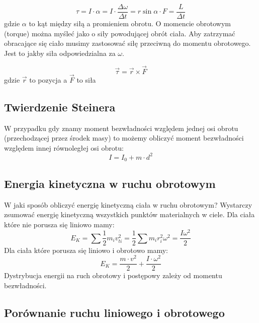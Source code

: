 \documentclass{../notatki}
\begin{document}
$$
\tau = I \cdot \alpha = I \cdot \frac{\Delta \omega}{\Delta t} =
r\sin\alpha \cdot F = \frac{L}{\Delta t}
$$
gdzie $\alpha$ to kąt między siłą a promieniem obrotu.
O momencie obrotowym (torque) można myśleć jako o siły powodującej obrót
ciała. Aby zatrzymać obracające się ciało musimy zastosować siłę przeciwną
do momentu obrotowego. Jest to jakby siła odpowiedzialna za $\omega$.

$$
\vec{\tau} = \vec{r} \times \vec{F}
$$
gdzie $\vec{r}$ to pozycja a $\vec{F}$ to siła

\subsection{Twierdzenie Steinera}

W przypadku gdy znamy moment bezwładności względem jednej osi obrotu
(przechodzącej przez środek masy) to możemy obliczyć moment bezwładności
względem innej równoległej osi obrotu:
$$
I = I_0 + m \cdot d^2
$$

\subsection{Energia kinetyczna w ruchu obrotowym}

W jaki sposób obliczyć energię kinetyczną ciała w ruchu obrotowym? Wystarczy
zsumować energię kinetyczną wszystkich punktów materialnych w ciele.
Dla ciała które nie porusza się liniowo mamy:
$$
E_K = \sum \frac{1}{2} m_i v_{ti}^2 = \frac{1}{2} \sum m_i r_i^2 \omega^2 =
\frac{I\omega^2}{2}
$$
Dla ciała które porusza się liniowo i obrotowo mamy:
$$
E_K = \frac{m \cdot v^2}{2} + \frac{I \cdot \omega^2}{2}
$$
Dystrybucja energii na ruch obrotowy i postępowy zależy od momentu bezwładności.

\subsection{Porównanie ruchu liniowego i obrotowego}
\end{document}
